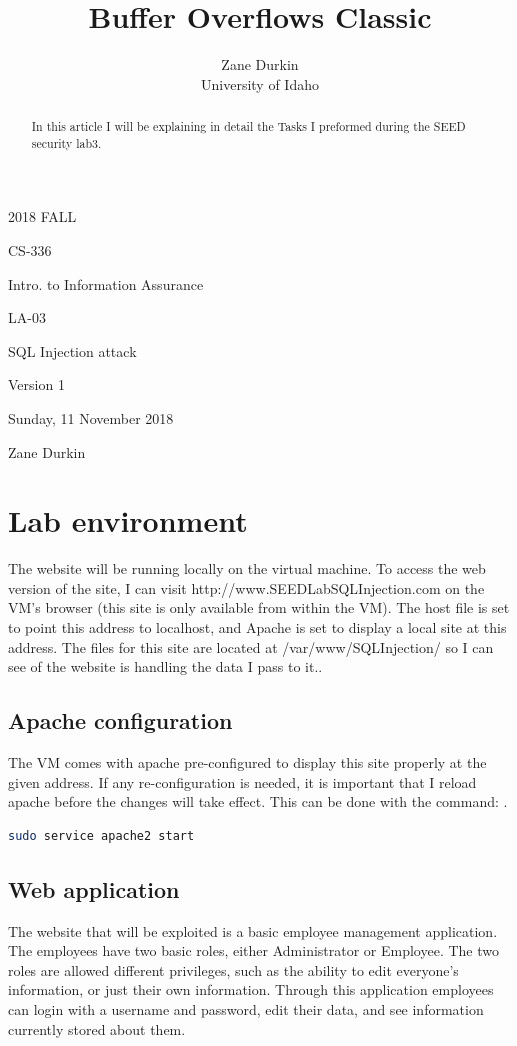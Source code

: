 \documentclass[14pt]{extarticle}
\begin{document}
\title{Buffer Overflows Classic}

\author{Zane Durkin\\
    University of Idaho}
\begin{description}[leftmargin=!, labelwidth=\widthof{\bfseries Author(s) Name(s)}]
\item [Year and Semester] 2018 FALL
\item [Course Number] CS-336
\item [Course Title] Intro. to Information Assurance
\item [Work Number] LA-03
\item [Work Name] SQL Injection attack
\item [Work Version] Version 1
\item [Long Date] Sunday, 11 November 2018
\item [Author(s) Name(s)] Zane Durkin
\end{description}
\begin{abstract}
In this article I will be explaining in detail the Tasks I preformed during the SEED security lab3.
\end{abstract}

\setcounter{section}{-1}
\section{Lab environment}
The website will be running locally on the virtual machine. To access the web version of the site, I can visit http://www.SEEDLabSQLInjection.com on the VM's browser (this site is only available from within the VM). The host file is set to point this address to localhost, and Apache is set to display a local site at this address. The files for this site are located at /var/www/SQLInjection/ so I can see of the website is handling the data I pass to it.\cite{seed-sqlatk}.

\subsection{Apache configuration}
The VM comes with apache pre-configured to display this site properly at the given address. If any re-configuration is needed, it is important that I reload apache before the changes will take effect. This can be done with the command:
\cite{seed-sqlatk}.
\begin{lstlisting}[language=sh]
sudo service apache2 start
\end{lstlisting}
\subsection{Web application}
The website that will be exploited is a basic employee management application. The employees have two basic roles, either Administrator or Employee. The two roles are allowed different privileges, such as the ability to edit everyone's information, or just their own information. Through this application employees can login with a username and password, edit their data, and see information currently stored about them\cite{seed-sqlatk}.
\end{document}
